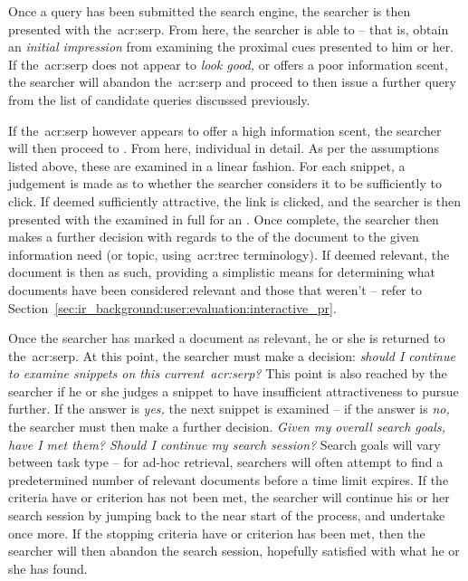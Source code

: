 Once a query has been submitted the search engine, the searcher is then presented with the~\gls{acr:serp}. From here, the searcher is able to  -- that is, obtain an \emph{initial impression} from examining the proximal cues presented to him or her. If the~\gls{acr:serp} does not appear to \emph{look good,} or offers a poor information scent, the searcher will abandon the~\gls{acr:serp} and proceed to then issue a further query from the list of candidate queries discussed previously.

If the~\gls{acr:serp} however appears to offer a high information scent, the searcher will then proceed to . From here, individual  in detail. As per the assumptions listed above, these are examined in a linear fashion. For each snippet, a judgement is made as to whether the searcher considers it to be sufficiently  to click. If deemed sufficiently attractive, the link is clicked, and the searcher is then presented with the  examined in full for an . Once complete, the searcher then makes a further decision with regards to the  of the document to the given information need (or topic, using~\gls{acr:trec} terminology). If deemed relevant, the document is then  as such, providing a simplistic means for determining what documents have been considered relevant and those that weren't -- refer to Section~\ref{sec:ir_background:user:evaluation:interactive_pr}.

Once the searcher has marked a document as relevant, he or she is returned to the~\gls{acr:serp}. At this point, the searcher must make a decision: \emph{should I continue to examine snippets on this current~\gls{acr:serp}?} This point is also reached by the searcher if he or she judges a snippet to have insufficient attractiveness to pursue further. If the answer is \emph{yes,} the next snippet is examined -- if the answer is \emph{no,} the searcher must then make a further decision. \emph{Given my overall search goals, have I met them? Should I continue my search session?} Search goals will vary between task type -- for ad-hoc retrieval, searchers will often attempt to find a predetermined number of relevant documents before a time limit expires. If the criteria have or criterion has not been met, the searcher will continue his or her search session by jumping back to the near start of the process, and undertake  once more. If the stopping criteria have or criterion has been met, then the searcher will then abandon the search session, hopefully satisfied with what he or she has found.

